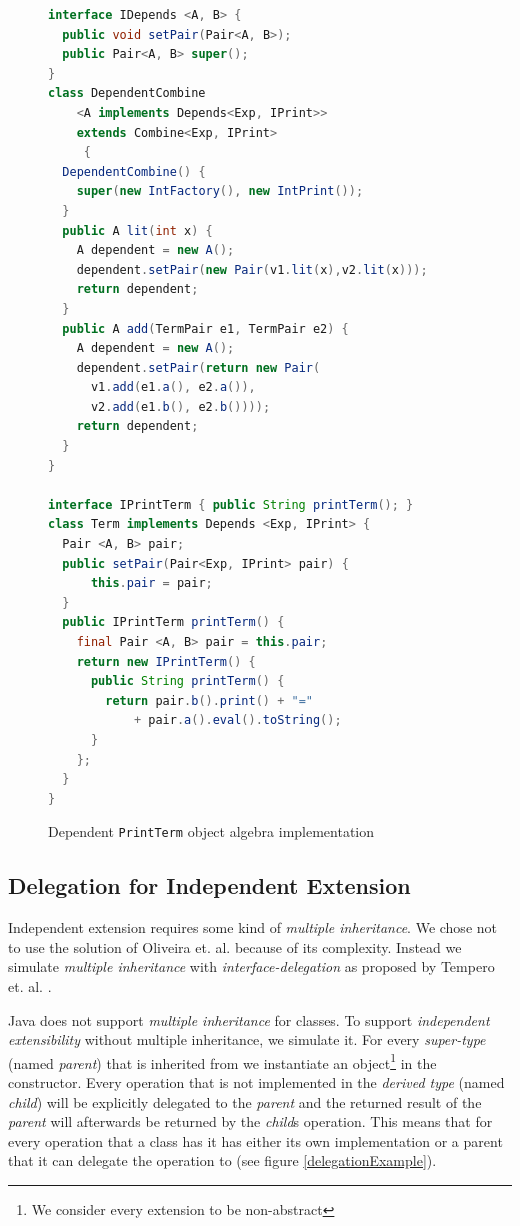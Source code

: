 \documentclass{report}
\begin{document}
\begin{figure}[H]
\begin{lstlisting}[language=java]
interface IDepends <A, B> {
  public void setPair(Pair<A, B>);
  public Pair<A, B> super();
}
class DependentCombine
    <A implements Depends<Exp, IPrint>>
    extends Combine<Exp, IPrint>
     {
  DependentCombine() {
    super(new IntFactory(), new IntPrint());
  }
  public A lit(int x) {
    A dependent = new A();
    dependent.setPair(new Pair(v1.lit(x),v2.lit(x)));
    return dependent;
  }
  public A add(TermPair e1, TermPair e2) {
    A dependent = new A();
    dependent.setPair(return new Pair(
      v1.add(e1.a(), e2.a()),
      v2.add(e1.b(), e2.b())));
    return dependent;
  }
}

interface IPrintTerm { public String printTerm(); }
class Term implements Depends <Exp, IPrint> {
  Pair <A, B> pair;
  public setPair(Pair<Exp, IPrint> pair) {
      this.pair = pair;
  }
  public IPrintTerm printTerm() {
    final Pair <A, B> pair = this.pair;
    return new IPrintTerm() {
      public String printTerm() {
        return pair.b().print() + "="
            + pair.a().eval().toString();
      }
    };
  }
}

\end{lstlisting}
\caption{Dependent \lstinline{PrintTerm} object algebra implementation}
\label{depentendPrintTerm}
\end{figure}



\subsection{Delegation for Independent Extension}

Independent extension requires some kind of \emph{multiple inheritance}. We chose not to use the solution of Oliveira et. al. because of its complexity. Instead we simulate \emph{multiple inheritance} with \emph{interface-delegation} as proposed by Tempero et. al. \cite{Tempero-Multiple-2000}.

Java does not support \emph{multiple inheritance} for classes. To support \emph{independent extensibility} without multiple inheritance, we simulate it. For every \emph{super-type} (named \emph{parent}) that is inherited from we instantiate an object\footnote{We consider every extension to be non-abstract} in the constructor. Every operation that is not implemented in the \emph{derived type} (named \emph{child}) will be explicitly delegated to the \emph{parent} and the returned result of the \emph{parent} will afterwards be returned by the \emph{child}s operation. This means that for every operation that a class has it has either its own implementation or a parent that it can delegate the operation to (see figure \ref{delegationExample}).
\end{document}

